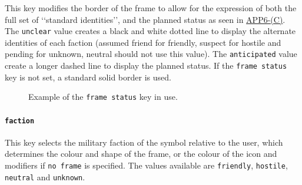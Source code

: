 \documentclass[a4paper, titlepage]{article}
\newcommand\DocLink{\href{https://www.awl.edu.pl/images/en/APP_6_C.pdf}{APP6-(C)}}
\begin{document}
This key modifies the border of the frame to allow for the expression of both the full set of \lq\lq{}standard identities\rq\rq{}, and the planned status as seen in \DocLink. The \texttt{unclear} value creates a black and white dotted line to display the alternate identities of each faction (assumed friend for friendly, suspect for hostile and pending for unknown, neutral should not use this value). The \texttt{anticipated} value create a longer dashed line to display the planned status. If the \texttt{frame status} key is not set, a standard solid border is used.

\begin{figure}[H]
\centering
{}
\caption{Example of the \texttt{frame status} key in use.}
\end{figure}


\paragraph{\texttt{faction}}

This key selects the military faction of the symbol relative to the user, which determines the colour and shape of the frame, or the colour of the icon and modifiers if \texttt{no frame} is specified. The values available are \texttt{friendly}, \texttt{hostile}, \texttt{neutral} and \texttt{unknown}.
\end{document}
